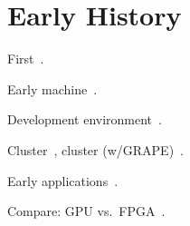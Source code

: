 \section{Early History}
\label{sec:history}

First~\cite{khdo06}.

Early machine~\cite{kdh+06}.

Development environment~\cite{cft+10}.

Cluster~\cite{tl10}, cluster (w/GRAPE)~\cite{sbm+09}.

Early applications~\cite{khdo06,shsc08,tl10}.

Compare: GPU vs.~FPGA~\cite{bnw+10,cls+08,cz09,jpbc10,sww+10,tb10}.
